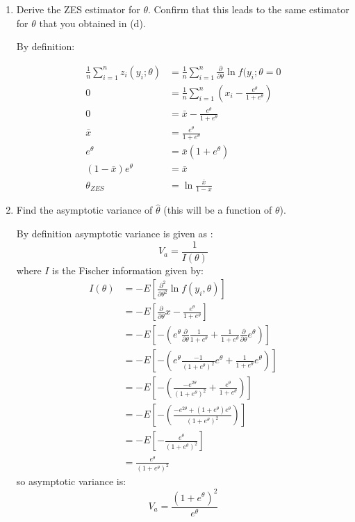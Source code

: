 \documentclass{article}
\newcommand{\1}{\mathbf{1}}
\begin{document}
\begin{enumerate}
    
    \newpage
    \item Derive the ZES estimator for $\theta$. Confirm that this leads to the same estimator for $\theta$ that you obtained in (d).
    
    By definition:
    
    \begin{align*}
        \frac{1}{n}\sum_{i=1}^n z_i(y_i ; \theta) &= \frac{1}{n} \sum_{i=1}^n \frac{\partial}{\partial \theta} \ln{f(y_i; \theta} = 0\\
        0 &= \frac{1}{n} \sum_{i=1}^n  \left( x_i - \frac{e^\theta}{1+e^\theta} \right) \\
        0 &= \bar x - \frac{e^\theta}{1+e^\theta} \\
        \bar x &= \frac{e^\theta}{1+e^\theta} \\
        e^\theta &= \bar x (1+e^\theta) \\
        (1 - \bar x) e^\theta &= \bar x \\
        \theta_{ZES} &= \ln{\frac{\bar x}{1-\bar x}}
    \end{align*}
    
    \item Find the asymptotic variance of $\hat{\theta}$ (this will be a function of $\theta$).
    
    By definition asymptotic variance is given as :
    $$V_a = \frac{1}{I(\theta)}$$
    where $I$ is the Fischer information given by: 
    \begin{align*}
        I(\theta) &= - E\left[  \frac{\partial^2}{\partial\theta^2} \ln f(y_i,\theta)  \right] \\
        &= - E\left[  \frac{\partial}{\partial\theta} x - \frac{e^\theta}{1+e^\theta}  \right] \\
        &= - E\left[ - \left(e^\theta \frac{\partial}{\partial\theta} \frac{1}{1+e^\theta}  +  \frac{1}{1+e^\theta} \frac{\partial}{\partial\theta} e^\theta \right)\right] \\
        &= - E\left[ - \left(e^\theta \frac{-1}{(1+e^\theta)^2}e^\theta  +  \frac{1}{1+e^\theta} e^\theta \right)\right] \\
        &= - E\left[ - \left(\frac{-e^{2\theta}}{(1+e^\theta)^2}  +  \frac{e^\theta}{1+e^\theta}  \right)\right] \\
        &= - E\left[ - \left(\frac{-e^{2\theta} + (1+e^\theta)e^\theta}{(1+e^\theta)^2} \right)\right] \\
        &= - E\left[ - \frac{e^\theta}{(1+e^\theta)^2} \right] \\
        &= \frac{e^\theta}{(1+e^\theta)^2}
    \end{align*}
    so asymptotic variance is: 
    $$V_a = \frac{(1+e^\theta)^2}{e^\theta}$$
    

\end{enumerate}
\end{document}
